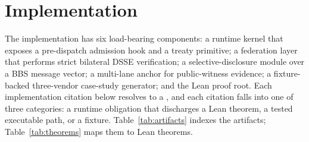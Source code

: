\section{Implementation}
\label{sec:implementation}

The implementation has six load-bearing components: a runtime kernel that exposes a pre-dispatch admission hook and a treaty primitive; a federation layer that performs strict bilateral DSSE verification; a selective-disclosure module over a BBS message vector; a multi-lane anchor for public-witness evidence; a fixture-backed three-vendor case-study generator; and the Lean proof root. Each implementation citation below resolves to a , and each citation falls into one of three categories: a runtime obligation that discharges a Lean theorem, a tested executable path, or a fixture. Table~\ref{tab:artifacts} indexes the artifacts; Table~\ref{tab:theorems} maps them to Lean theorems.

